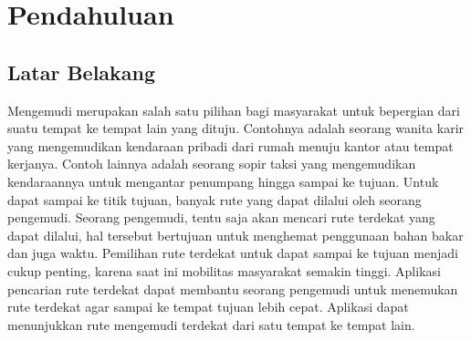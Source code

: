 \chapter{Pendahuluan}
\section{Latar Belakang}
Mengemudi merupakan salah satu pilihan bagi masyarakat untuk bepergian dari
suatu tempat ke tempat lain yang dituju. Contohnya adalah seorang wanita karir yang mengemudikan 
kendaraan pribadi dari rumah menuju kantor atau tempat kerjanya. Contoh lainnya adalah seorang sopir 
taksi yang mengemudikan kendaraannya untuk mengantar penumpang hingga sampai ke tujuan. Untuk dapat 
sampai ke titik tujuan, banyak rute yang dapat dilalui oleh seorang pengemudi. Seorang pengemudi, tentu 
saja akan mencari rute terdekat yang dapat dilalui, hal tersebut bertujuan untuk
menghemat penggunaan bahan bakar dan juga waktu. Pemilihan rute terdekat untuk dapat sampai 
ke tujuan menjadi cukup penting, karena saat ini mobilitas masyarakat semakin
tinggi.
Aplikasi pencarian rute terdekat dapat membantu seorang pengemudi untuk menemukan rute terdekat 
agar sampai ke tempat tujuan lebih cepat. Aplikasi dapat menunjukkan rute
mengemudi terdekat dari satu tempat ke tempat lain. 

